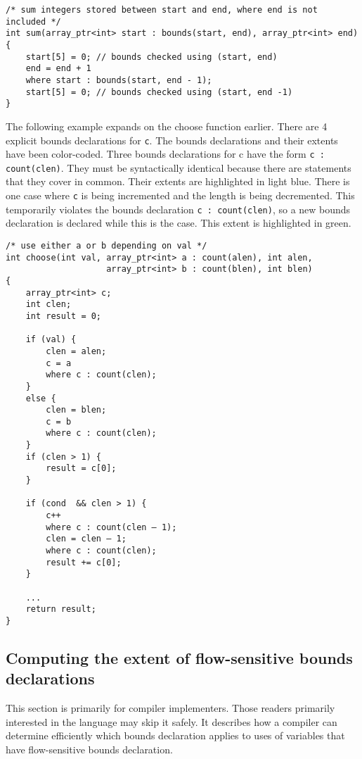 \begin{verbatim}
/* sum integers stored between start and end, where end is not included */
int sum(array_ptr<int> start : bounds(start, end), array_ptr<int> end)
{ 
    start[5] = 0; // bounds checked using (start, end)
    end = end + 1
    where start : bounds(start, end - 1);
    start[5] = 0; // bounds checked using (start, end -1)
}
\end{verbatim}

The following example expands on the choose function earlier. There are
4 explicit bounds declarations for \texttt{c}. The bounds declarations
and their extents have been color-coded. Three bounds declarations for c
have the form \texttt{c : count(clen)}. They must be syntactically
identical because there are statements that they cover in common. Their
extents are highlighted in light blue. There is one case where
\texttt{c} is being incremented and the length is being decremented.
This temporarily violates the bounds declaration \texttt{c :
count(clen)}, so a new bounds declaration is declared while this is the
case. This extent is highlighted in green.

\begin{verbatim}
/* use either a or b depending on val */
int choose(int val, array_ptr<int> a : count(alen), int alen,
                    array_ptr<int> b : count(blen), int blen) 
{
    array_ptr<int> c;
    int clen;
    int result = 0;

    if (val) {
        clen = alen;
        c = a
        where c : count(clen);
    }
    else {
        clen = blen;
        c = b
        where c : count(clen);
    }
    if (clen > 1) {
        result = c[0];
    }

    if (cond  && clen > 1) {
        c++
        where c : count(clen – 1);
        clen = clen – 1;
        where c : count(clen);
        result += c[0];
    }
    
    ...
    return result;
}
\end{verbatim}

\subsection{Computing the extent of flow-sensitive bounds declarations}

This section is primarily for compiler implementers. Those readers
primarily interested in the language may skip it safely. It describes
how a compiler can determine efficiently which bounds declaration
applies to uses of variables that have flow-sensitive bounds
declaration.

